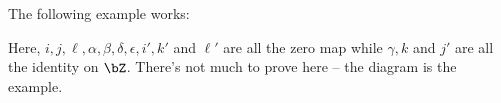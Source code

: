 \begin{homework}[e]
\begin{prf}
    The following example works:
      \begin{center}
      \end{center}
    Here, $i, j, \ell, \alpha, \beta, \delta, \epsilon, i', k'$ and $\ell'$ are all the zero map while $\gamma, k$ and $j'$ are all the identity on $\bZ$. There's not much to prove here -- the diagram is the example. 
  \end{prf}
\end{homework}

